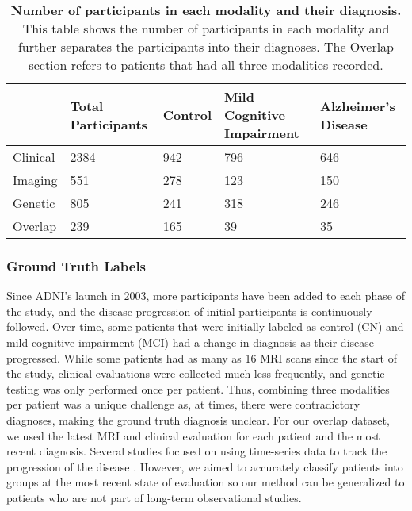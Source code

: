 \documentclass[11pt]{article}
\begin{document}
\begin{table}[H] 
\centering
\caption{\textbf{Number of participants in each modality and their diagnosis.} This table shows the number of participants in each modality and further separates the participants into their diagnoses. The Overlap section refers to patients that had all three modalities recorded.}
\begin{tabular}{|l|l|l|l|l|} 
\hline
         & \textbf{Total Participants} & \textbf{Control} & \textbf{Mild Cognitive Impairment} & \textbf{Alzheimer's Disease} \\ \hline
Clinical & 2384               & 942     & 796                         & 646                 \\ \hline
Imaging  & 551                & 278     & 123                         & 150                 \\ \hline
Genetic  & 805                & 241     & 318                         & 246                 \\ \hline
Overlap  & 239                & 165     & 39                          & 35                  \\ \hline
\end{tabular}
\label{tab:participants}
\end{table}


\subsubsection*{Ground Truth Labels}
Since ADNI's launch in 2003, more participants have been added to each phase of the study, and the disease progression of initial participants is continuously followed. Over time, some patients that were initially labeled as control (CN) and mild cognitive impairment (MCI) had a change in diagnosis as their disease progressed. While some patients had as many as 16 MRI scans since the start of the study, clinical evaluations were collected much less frequently, and genetic testing was only performed once per patient. Thus, combining three modalities per patient was a unique challenge as, at times, there were contradictory diagnoses, making the ground truth diagnosis unclear. For our overlap dataset, we used the latest MRI and clinical evaluation for each patient and the most recent diagnosis. Several studies focused on using time-series data to track the progression of the disease \cite{ELSAPPAGH2020197,ABUHMED2021106688,guerrero2016instantiated,jedynak2012computational,yau2015longitudinal}. However, we aimed to accurately classify patients into groups at the most recent state of evaluation so our method can be generalized to patients who are not part of long-term observational studies. 
\end{document}
